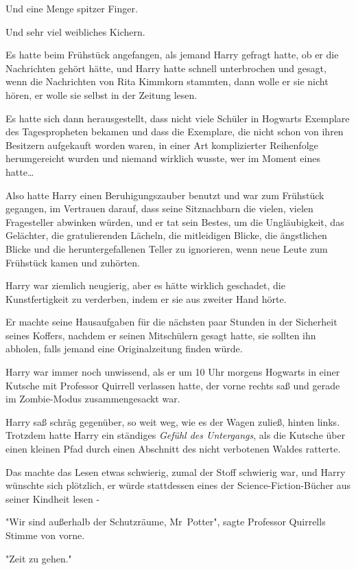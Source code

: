 {Und eine Menge spitzer Finger.

Und sehr viel weibliches Kichern.

Es hatte beim Frühstück angefangen, als jemand Harry gefragt hatte, ob er die Nachrichten gehört hätte, und Harry hatte schnell unterbrochen und gesagt, wenn die Nachrichten von Rita Kimmkorn stammten, dann wolle er sie nicht hören, er wolle sie selbst in der Zeitung lesen.

Es hatte sich dann herausgestellt, dass nicht viele Schüler in Hogwarts Exemplare des Tagespropheten bekamen und dass die Exemplare, die nicht schon von ihren Besitzern aufgekauft worden waren, in einer Art komplizierter Reihenfolge herumgereicht wurden und niemand wirklich wusste, wer im Moment eines hatte…

Also hatte Harry einen Beruhigungszauber benutzt und war zum Frühstück gegangen, im Vertrauen darauf, dass seine Sitznachbarn die vielen, vielen Fragesteller abwinken würden, und er tat sein Bestes, um die Ungläubigkeit, das Gelächter, die gratulierenden Lächeln, die mitleidigen Blicke, die ängstlichen Blicke und die heruntergefallenen Teller zu ignorieren, wenn neue Leute zum Frühstück kamen und zuhörten.

Harry war ziemlich neugierig, aber es hätte wirklich geschadet, die Kunstfertigkeit zu verderben, indem er sie aus zweiter Hand hörte.

Er machte seine Hausaufgaben für die nächsten paar Stunden in der Sicherheit seines Koffers, nachdem er seinen Mitschülern gesagt hatte, sie sollten ihn abholen, falls jemand eine Originalzeitung finden würde.

Harry war immer noch unwissend, als er um 10 Uhr morgens Hogwarts in einer Kutsche mit Professor Quirrell verlassen hatte, der vorne rechts saß und gerade im Zombie-Modus zusammengesackt war.

Harry saß schräg gegenüber, so weit weg, wie es der Wagen zuließ, hinten links. Trotzdem hatte Harry ein ständiges \emph{Gefühl des Untergangs}, als die Kutsche über einen kleinen Pfad durch einen Abschnitt des nicht verbotenen Waldes ratterte.

Das machte das Lesen etwas schwierig, zumal der Stoff schwierig war, und Harry wünschte sich plötzlich, er würde stattdessen eines der Science-Fiction-Bücher aus seiner Kindheit lesen -

"Wir sind außerhalb der Schutzräume, Mr~Potter", sagte Professor Quirrells Stimme von vorne.

"Zeit zu gehen."

}
